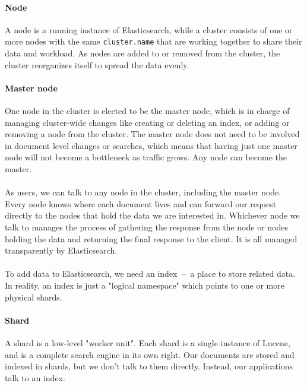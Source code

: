 \documentclass{article}%
\begin{document}
\paragraph{Node} A node is a running instance of Elasticsearch, while a cluster consists of one or more nodes with the same \texttt{cluster.name} that are working together to share their data and workload. As nodes are added to or removed from the cluster, the cluster reorganizes itself to spread the data evenly.

\paragraph{Master node} One node in the cluster is elected to be the master node, which is in charge of managing cluster-wide changes like creating or deleting an index, or adding or removing a node from the cluster. The master node does not need to be involved in document level changes or searches, which means that having just one master node will not become a bottleneck as traffic grows. Any node can become the master.

\paragraph{} As users, we can talk to any node in the cluster, including the master node. Every node knows where each document lives and can forward our request directly to the nodes that hold the data we are interested in. Whichever node we talk to manages the process of gathering the response from the node or nodes holding the data and returning the final response to the client. It is all managed transparently by Elasticsearch.

\paragraph{} To add data to Elasticsearch, we need an index  --  a place to store related data. In reality, an index is just a "logical namespace" which points to one or more physical shards.

\paragraph{Shard} A shard is a low-level "worker unit". Each shard is a single instance of Lucene, and is a complete search engine in its own right. Our documents are stored and indexed in shards, but we don’t talk to them directly. Instead, our applications talk to an index.
\end{document}
